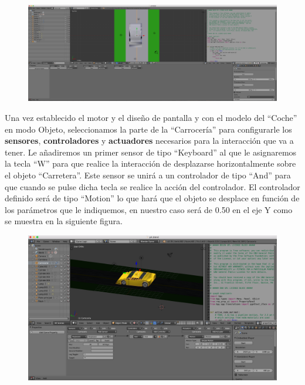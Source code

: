 \documentclass[10pt]{article}
\begin{document}
\begin{figure}[H]
	\begin{center}
	 		\includegraphics[width = 1.00\textwidth]{Imagenes/p4-img2}
	\end{center} 
\end{figure}

Una vez establecido el motor y el diseño de pantalla y con el modelo del ``Coche'' en modo Objeto, seleccionamos la parte de la ``Carrocería'' para configurarle los \textbf{sensores}, \textbf{controladores} y \textbf{actuadores} necesarios para la interacción que va a tener. Le añadiremos un primer sensor de tipo ``Keyboard'' al que le asignaremos la tecla ``W'' para que realice la interacción de desplazarse horizontalmente sobre el objeto ``Carretera''. Este sensor se unirá a un controlador de tipo ``And'' para que cuando se pulse dicha tecla se realice la acción del controlador. El controlador definido será de tipo ``Motion'' lo que hará que el objeto se desplace en función de los parámetros que le indiquemos, en nuestro caso será de 0.50 en el eje Y como se muestra en la siguiente figura. \\

\begin{figure}[H]
	\begin{center}
	 		\includegraphics[width = 1.00\textwidth]{Imagenes/p4-img3}
	\end{center} 
\end{figure}
\end{document}
